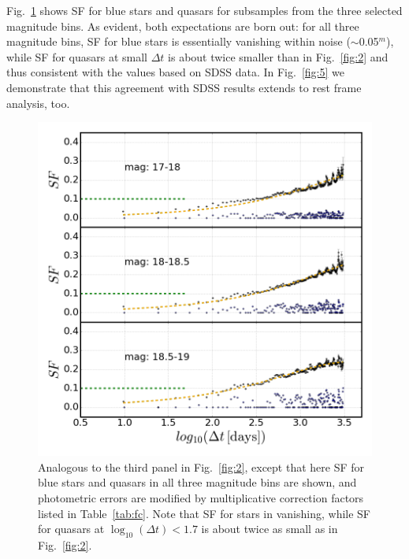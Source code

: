 \documentclass[fleqn,usenatbib]{mnras}
\begin{document}
Fig.~\ref{fig:4} shows SF for blue stars and quasars for subsamples from the three selected magnitude bins. 
As evident, both expectations are born out: for all three magnitude bins, SF for blue stars is essentially 
vanishing within noise ($\sim$0.05$^m$), while SF for quasars at small $\Delta t$ is about twice smaller 
than in Fig.~\ref{fig:2} and thus consistent with the values based on SDSS data. In Fig.~\ref{fig:5} we 
demonstrate that this agreement with SDSS results extends to rest frame analysis, too. 

\begin{figure}
\vskip -0.15in
\includegraphics[width=1.1\columnwidth, center]{Fig_4_SF_QSO_starsB_r_cut.png}
\caption{Analogous to the third panel in Fig.~\ref{fig:2}, except that here SF for blue stars and quasars in
all three magnitude bins are shown, and photometric errors are modified by multiplicative correction factors 
listed in Table~\ref{tab:fc}. Note that SF for stars in vanishing, while SF for quasars at $\log_{10}(\Delta t) < 1.7$  
is about twice as small as in Fig.~\ref{fig:2}.} 
\label{fig:4}
\end{figure}
\end{document}
